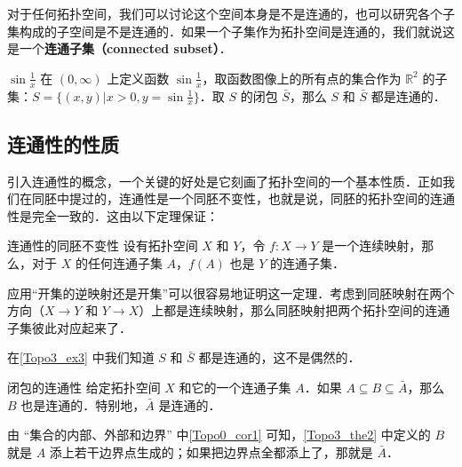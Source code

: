 对于任何拓扑空间，我们可以讨论这个空间本身是不是连通的，也可以研究各个子集构成的子空间是不是连通的．如果一个子集作为拓扑空间是连通的，我们就说这是一个\textbf{连通子集（connected subset）}．

\begin{example}{$\sin{\frac{1}{x}}$}\label{Topo3_ex3}
在 $(0,\infty)$ 上定义函数 $\sin{\frac{1}{x}}$，取函数图像上的所有点的集合作为 $\mathbb{R}^2$ 的子集：$S=\{(x, y)|x>0, y=\sin{\frac{1}{x}}\}$．取 $S$ 的闭包 $\bar{S}$，那么 $S$ 和 $\bar{S}$ 都是连通的．
\end{example}

\subsection{连通性的性质}

引入连通性的概念，一个关键的好处是它刻画了拓扑空间的一个基本性质．正如我们在同胚中提过的，连通性是一个同胚不变性，也就是说，同胚的拓扑空间的连通性是完全一致的．这由以下定理保证：

\begin{theorem}{连通性的同胚不变性}\label{Topo3_the1}
设有拓扑空间 $X$ 和 $Y$，令 $f:X\rightarrow Y$ 是一个连续映射，那么，对于 $X$ 的任何连通子集 $A$，$f(A)$ 也是 $Y$ 的连通子集．
\end{theorem}

应用“开集的逆映射还是开集”可以很容易地证明这一定理．考虑到同胚映射在两个方向（$X\rightarrow Y$ 和 $Y\rightarrow X$）上都是连续映射，那么同胚映射把两个拓扑空间的连通子集彼此对应起来了．

在\autoref{Topo3_ex3} 中我们知道 $S$ 和 $\bar{S}$ 都是连通的，这不是偶然的．

\begin{theorem}{闭包的连通性}\label{Topo3_the2}
给定拓扑空间 $X$ 和它的一个连通子集 $A$．如果 $A\subseteq B\subseteq\bar{A}$，那么 $B$ 也是连通的．特别地，$\bar{A}$ 是连通的．
\end{theorem}

由 “集合的内部、外部和边界” 中\autoref{Topo0_cor1} 可知，\autoref{Topo3_the2} 中定义的 $B$ 就是 $A$ 添上若干边界点生成的；如果把边界点全都添上了，那就是 $\bar{A}$．